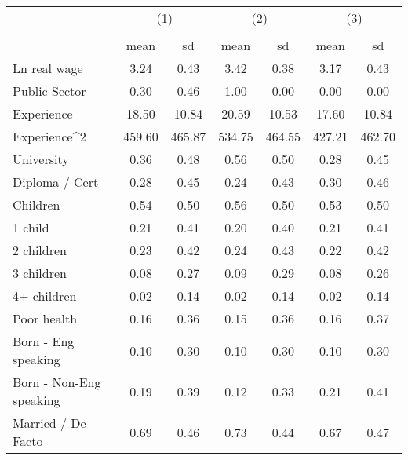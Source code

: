 {
\def\sym#1{\ifmmode^{#1}\else\(^{#1}\)\fi}
\begin{tabular}{l*{3}{cc}}
\hline\hline
                    &\multicolumn{2}{c}{(1)}  &\multicolumn{2}{c}{(2)}  &\multicolumn{2}{c}{(3)}  \\
                    &\multicolumn{2}{c}{}     &\multicolumn{2}{c}{}     &\multicolumn{2}{c}{}     \\
                    &        mean&          sd&        mean&          sd&        mean&          sd\\
\hline
Ln real wage        &        3.24&        0.43&        3.42&        0.38&        3.17&        0.43\\
Public Sector       &        0.30&        0.46&        1.00&        0.00&        0.00&        0.00\\
Experience          &       18.50&       10.84&       20.59&       10.53&       17.60&       10.84\\
Experience^{2}      &      459.60&      465.87&      534.75&      464.55&      427.21&      462.70\\
University          &        0.36&        0.48&        0.56&        0.50&        0.28&        0.45\\
Diploma / Cert      &        0.28&        0.45&        0.24&        0.43&        0.30&        0.46\\
Children            &        0.54&        0.50&        0.56&        0.50&        0.53&        0.50\\
1 child             &        0.21&        0.41&        0.20&        0.40&        0.21&        0.41\\
2 children          &        0.23&        0.42&        0.24&        0.43&        0.22&        0.42\\
3 children          &        0.08&        0.27&        0.09&        0.29&        0.08&        0.26\\
4+ children         &        0.02&        0.14&        0.02&        0.14&        0.02&        0.14\\
Poor health         &        0.16&        0.36&        0.15&        0.36&        0.16&        0.37\\
Born - Eng speaking &        0.10&        0.30&        0.10&        0.30&        0.10&        0.30\\
Born - Non-Eng speaking&        0.19&        0.39&        0.12&        0.33&        0.21&        0.41\\
Married / De Facto  &        0.69&        0.46&        0.73&        0.44&        0.67&        0.47\\

\end{tabular}}
